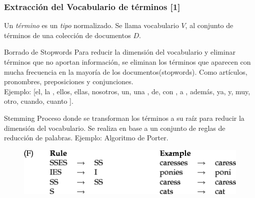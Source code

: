 \documentclass[mathserif]{beamer}
\begin{document}
\begin{frame}\frametitle{Extracción del Vocabulario de términos [1]}
\footnotesize{

Un \emph{término} es un \emph{tipo} normalizado. Se llama vocabulario $V$, al conjunto de términos de una colección de documentos $D$.
 
\begin{block}{Borrado de Stopwords}
Para reducir la dimensión del vocabulario y eliminar términos que no aportan información, se eliminan los términos que aparecen
con mucha frecuencia en la mayoría de los documentos(stopwords). Como artículos, pronombres,  preposiciones y conjunciones. \\
Ejemplo: [el, la , ellos, ellas,  nosotros, un, una , de, con , a , además, ya, y, muy, otro, cuando, cuanto ]. 
\end{block}

\begin{block}{Stemming}
Proceso donde se transforman los términos a su raíz para reducir la dimensión del vocabulario. Se realiza en base a un conjunto de reglas de reducción de palabras. Ejemplo: Algoritmo de Porter.

\begin{figure}[h!]
	\centering
	\includegraphics[scale=0.45]{pics/porter.png}
\end{figure}


\end{block}
}
 
\end{frame}
\end{document}

